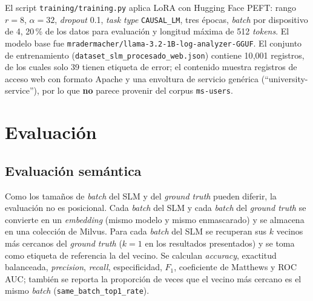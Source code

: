 El script \texttt{training/training.py} aplica LoRA con Hugging Face PEFT: rango $r=8$, $\alpha=32$, \textit{dropout} 0.1, \textit{task type} \texttt{CAUSAL\_LM}, tres épocas, \textit{batch} por dispositivo de 4, 20\,\% de los datos para evaluación y longitud máxima de 512 \textit{tokens}. El modelo base fue \texttt{mradermacher/llama-3.2-1B-log-analyzer-GGUF}. El conjunto de entrenamiento (\texttt{dataset\_slm\_procesado\_web.json}) contiene 10{,}001 registros, de los cuales solo 39 tienen etiqueta de error; el contenido muestra registros de acceso web con formato Apache y una envoltura de servicio genérica (``university-service''), por lo que \textbf{no} parece provenir del corpus \texttt{ms-users}.

\section{Evaluación}\label{sec:met_evaluacion}

\subsection{Evaluación semántica}

Como los tamaños de \textit{batch} del SLM y del \textit{ground truth} pueden diferir, la evaluación no es posicional. Cada \textit{batch} del SLM y cada \textit{batch} del \textit{ground truth} se convierte en un \textit{embedding} (mismo modelo y mismo enmascarado) y se almacena en una colección de Milvus. Para cada \textit{batch} del SLM se recuperan sus $k$ vecinos más cercanos del \textit{ground truth} ($k=1$ en los resultados presentados) y se toma como etiqueta de referencia la del vecino. Se calculan \textit{accuracy}, exactitud balanceada, \textit{precision}, \textit{recall}, especificidad, $F_1$, coeficiente de Matthews y ROC AUC; también se reporta la proporción de veces que el vecino más cercano es el mismo \textit{batch} (\texttt{same\_batch\_top1\_rate}). %

